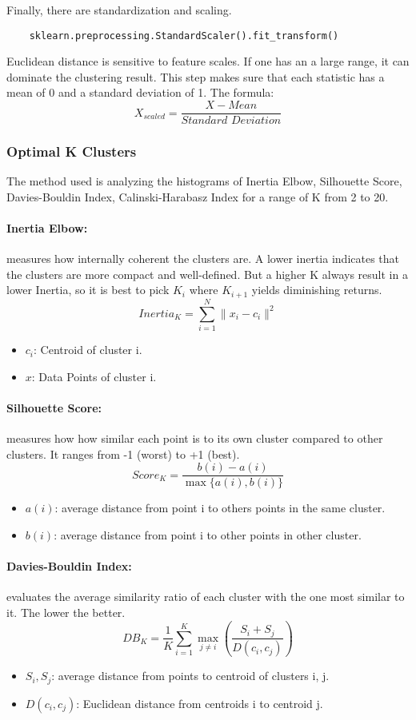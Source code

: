 \documentclass{report}
\begin{document}
\noindent Finally, there are standardization and scaling.
\begin{verbatim}
    sklearn.preprocessing.StandardScaler().fit_transform()
\end{verbatim}
Euclidean distance is sensitive to feature scales. If one has an a large range, it can dominate the 
clustering result. This step makes sure that each statistic has a mean of 0 and a standard deviation 
of 1. The formula:
\[ X_{scaled} = \frac{X - Mean}{\textit{Standard Deviation}} \]

\subsubsection{Optimal K Clusters}
The method used is analyzing the histograms of Inertia Elbow, Silhouette Score, Davies-Bouldin Index,
Calinski-Harabasz Index for a range of K from 2 to 20.

\paragraph{Inertia Elbow:} measures how internally coherent the clusters are. A lower inertia 
indicates that the clusters are more compact and well-defined. But a higher K always result in a lower
Inertia, so it is best to pick $K_i$ where $K_{i+1}$ yields diminishing returns.
\[ Inertia_K = \sum_{i=1}^{N} \| x_i - c_i \|^2 \]
\begin{itemize}
    \item \( c_i \): Centroid of cluster i. 
    \item \( x \): Data Points of cluster i.
\end{itemize}

\paragraph{Silhouette Score:} measures how how similar each point is to its own cluster compared to 
other clusters. It ranges from -1 (worst) to +1 (best).
\[ Score_K = \frac{b(i) - a(i)}{\max\{a(i), b(i)\}} \]
\begin{itemize}
    \item \( a(i) \): average distance from point i to others points in the same cluster.
    \item \( b(i) \): average distance from point i to other points in other cluster.
\end{itemize}

\paragraph{Davies-Bouldin Index:}  evaluates the average similarity ratio of each cluster with the one 
most similar to it. The lower the better.
\[ DB_K = \frac{1}{K} \sum_{i=1}^{K} \max_{j \neq i} \left( \frac{S_i + S_j}{D(c_i, c_j)} \right) \]
\begin{itemize}
    \item \( S_i, S_j \): average distance from points to centroid of clusters i, j.
    \item \( D(c_i, c_j) \): Euclidean distance from centroids i to centroid j.
\end{itemize}
\end{document}
